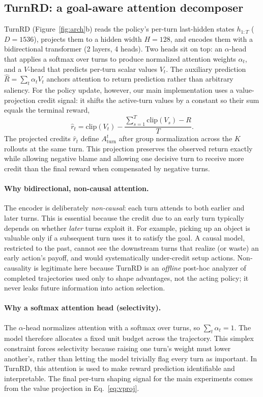 \documentclass{article}
\newcommand{\Aturn}{A_{\text{turn}}}
\begin{document}
\subsection{TurnRD: a goal-aware attention decomposer}
TurnRD (Figure~\ref{fig:arch}b) reads the policy's per-turn last-hidden states $h_{1:T}$
($D{=}1536$), projects them to a hidden width $H{=}128$, and encodes them with a bidirectional
transformer (2 layers, 4 heads). Two heads sit on top: an $\alpha$-head that applies a softmax
over turns to produce normalized attention weights $\alpha_t$, and a $V$-head that predicts
per-turn scalar values $V_t$. The auxiliary prediction $\hat{R}=\sum_t \alpha_t V_t$ anchors
attention to return prediction rather than arbitrary saliency. For the policy update, however,
our main implementation uses a value-projection credit signal: it shifts the active-turn
values by a constant so their sum equals the terminal reward,
\begin{equation}
\hat{r}_t = \mathrm{clip}(V_t) - \frac{\sum_{s=1}^{T}\mathrm{clip}(V_s)-R}{T}.
\label{eq:vproj}
\end{equation}
The projected credits $\hat{r}_t$ define $\Aturn^{t}$ after group normalization across the $K$
rollouts at the same turn. This projection preserves the observed return exactly while
allowing negative blame and allowing one decisive turn to receive more credit than the final
reward when compensated by negative turns.

\paragraph{Why bidirectional, non-causal attention.}
The encoder is deliberately \emph{non-causal}: each turn attends to both earlier and later
turns. This is essential because the credit due to an early turn typically depends on whether
\emph{later} turns exploit it. For example, picking up an object is valuable only if a
subsequent turn uses it to satisfy the goal. A causal model, restricted to the past, cannot see the downstream
turns that realize (or waste) an early action's payoff, and would systematically under-credit
setup actions. Non-causality is legitimate here because TurnRD is an \emph{offline} post-hoc
analyzer of completed trajectories used only to shape advantages, not the acting policy; it
never leaks future information into action selection.

\paragraph{Why a softmax attention head (selectivity).}
The $\alpha$-head normalizes attention with a softmax over turns, so $\sum_t \alpha_t = 1$.
The model therefore allocates a fixed unit budget across the trajectory. This simplex
constraint forces selectivity because raising one turn's weight must lower another's, rather
than letting the model trivially flag every turn as important. In TurnRD, this attention is
used to make reward prediction identifiable and interpretable. The final per-turn shaping
signal for the main experiments comes from the value projection in Eq.~\eqref{eq:vproj}.
\end{document}
